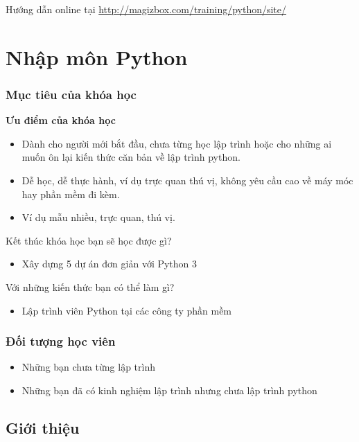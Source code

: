
Hướng dẫn online tại \href{http://magizbox.com/training/python/site/}{http://magizbox.com/training/python/site/}

\chapter{Nhập môn Python}

\subsection{Mục tiêu của khóa học}

\textbf{Ưu điểm của khóa học}

\begin{itemize}
  \item Dành cho người mới bắt đầu, chưa từng học lập trình hoặc cho những ai muốn ôn lại kiến thức căn bản về lập trình python.
  \item Dễ học, dễ thực hành, ví dụ trực quan thú vị, không yêu cầu cao về máy móc hay phần mềm đi kèm.
  \item Ví dụ mẫu nhiều, trực quan, thú vị.
\end{itemize}

Kết thúc khóa học bạn sẽ học được gì?

\begin{itemize}
  \item Xây dựng 5 dự án đơn giản với Python 3
\end{itemize}

Với những kiến thức bạn có thể làm gì?

\begin{itemize}
  \item Lập trình viên Python tại các công ty phần mềm
\end{itemize}

\subsection{Đối tượng học viên}

\begin{itemize}
  \item Những bạn chưa từng lập trình
  \item Những bạn đã có kinh nghiệm lập trình nhưng chưa lập trình python
\end{itemize}

\section{Giới thiệu}

